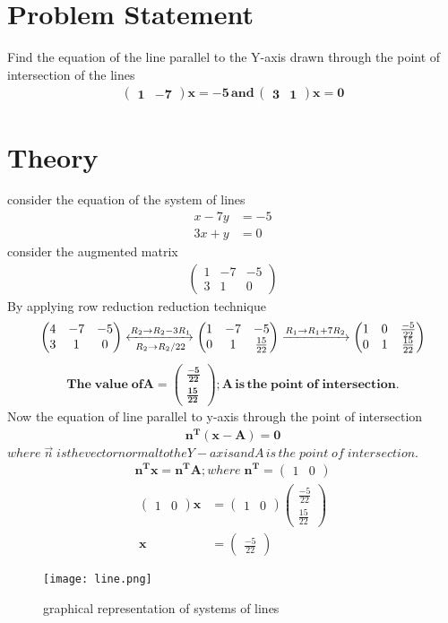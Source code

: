 \documentclass{article}
\newcommand{\myvec}[1]{\ensuremath{\begin{pmatrix}#1\end{pmatrix}}}
\begin{document}
\section{Problem Statement}
Find the equation of the line parallel to the Y-axis drawn through the point of intersection of the lines
\begin{align}
\mathbf{\myvec{1 & -7}x  =-5 \, and \, \myvec{3 & 1}x  = 0}
\end{align}
\section{Theory}
consider the equation of the system of lines
\begin{align}
x - 7y & = -5 \\
3x + y & = 0
\end{align}
 consider the augmented matrix
 \begin{align}
 \myvec{1 & -7 & -5 \\ 3 & 1 & 0}
 \end{align}
 By applying row reduction reduction technique \\
 \begin{align}
\myvec{4 & -7 & -5\\ 3 & 1 & 0}
	\xleftrightarrow[R_2 \rightarrow R_2/22]{R_2 \rightarrow R_2-3R_1}
	\myvec{1 & -7 & -5 \\ 0 & 1 & \frac{15}{22}}
	\xrightarrow[]{R_1 \rightarrow R_1+7R_2}
	 \myvec{1 & 0 & \frac{-5}{22} \\ 0 & 1 & \frac{15}{22}}
 \end{align}
\begin{align}
\mathbf{The\; value\; of{A} = \myvec{\frac{-5}{22} \\ \frac{15}{22}} ;
{A} \,is\, the\; point\; of \;intersection.}
\end{align}
 Now the equation of line parallel to y-axis through the point of intersection\\
\begin{align}
\mathbf{{n}^T({x}-{A}) = 0}
\end{align}
$where \;\vec{n} \; is the vector normal to the Y - axis and{A}\, is\, the\; point\; of\; intersection.$\\
\begin{align*}
\bm{{n}^T{x}} = \bm{{n}^T{A}} ; where \;
\bm{{n}^T} = \myvec{1 & 0}
 \end{align*}
 \begin{align}
\myvec{1 & 0}\bm{x} &  = \myvec{1 & 0} \myvec{\frac{-5}{22} \\ \frac{15}{22}}\\
\bm{{x}} & = \myvec{\frac{-5}{22}} 
 \end{align}
 \begin{figure}
 \centering
 \texttt{[image: line.png]}
 \caption{graphical representation of systems of lines}
 \end{figure}
\end{document}

